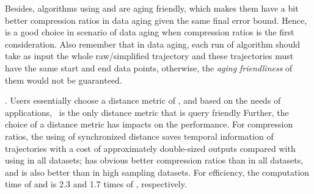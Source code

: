 {Besides, algorithms \dpa using \ped and \sed are aging friendly, which makes them have a bit better compression ratios in data aging given the same final error bound. Hence, \dpa is a good choice in scenario of data aging when compression ratios is the first consideration. Also remember that in data aging, each run of algorithm \dpa should take as input the whole raw/simplified trajectory and these trajectories must have the same start and end data points, otherwise, the \emph{aging friendliness} of them would not be guaranteed.}

. Users essentially choose a distance metric of \ped, \sed and \dad based on the needs of applications, \eg~\sed is the only distance metric that is query friendly 
%
Further, the choice of a distance metric has impacts on the performance.
For compression ratios, the using of synchronized distance \sed saves temporal information of trajectories with a cost of approximately double-sized outputs compared with using \ped in all datasets; \ped has obvious better compression ratios than \dad in all datasets, and \sed is also better than \dad in high sampling datasets.
For efficiency, the computation time of \ped and \sed is 2.3 and 1.7 times of \dad, respectively.



%
%
